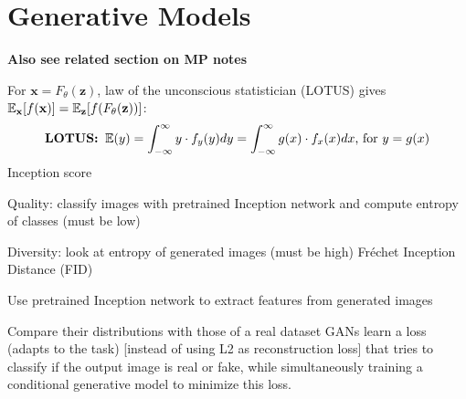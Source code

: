 \documentclass[12pt]{article}
\begin{document}
\section{Generative Models}
\textbf{Also see related section on MP notes}
\par For $\mathbf{x} = F_{\theta}(\mathbf{z})$, law of the unconscious statistician (LOTUS) gives $\operatorname{\mathbb{E}}_{\mathbf{x}}[f(\mathbf{x})] = \operatorname{\mathbb{E}}_{\mathbf{z}}[f(F_{\theta}(\mathbf{z}))]$:
\[ \textbf{LOTUS: } \operatorname{\mathbb{E}}(y) = \int_{-\infty}^{\infty} y \cdot f_y(y) dy = \int_{-\infty}^{\infty} g(x) \cdot f_x(x) dx \text{, for } y=g(x) \]
Inception score
\ulb
\item Quality: classify images with pretrained Inception network and compute entropy of classes (must be low)
\item Diversity: look at entropy of generated images (must be high)
\ule
Fréchet Inception Distance (FID)
\olb
\item Use pretrained Inception network to extract features from generated images
\item Compare their distributions with those of a real dataset
\ole
GANs learn a loss (adapts to the task) [instead of using L2 as reconstruction loss] that tries to classify if the output image is real or fake, while simultaneously training a conditional generative model to minimize this loss.
\end{document}
